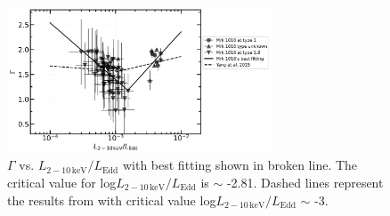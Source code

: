 \documentclass[twocolumn]{aastex63}
\begin{document}
\begin{figure}
\centering
	\includegraphics[width=0.7\textwidth]{./pic/xrayappendgood-errorbar-Lrate-g-tmap_brokenlinear_dot.png}
    \caption{$\Gamma$ vs. $L_\mathrm{2-10\,keV}/L_\mathrm{Edd}$ with best fitting shown in broken line. The critical value for log$L_\mathrm{2-10\,keV}/L_\mathrm{Edd}$ is $\sim$ -2.81. Dashed lines represent the results from \citet{2015MNRAS.447.1692Y} with critical value log$L_\mathrm{2-10\,keV}/L_\mathrm{Edd}$ $\sim$ -3. }
    \label{fig:xrayappendgood-Lrateandg-tmap}
\end{figure}
\end{document}
